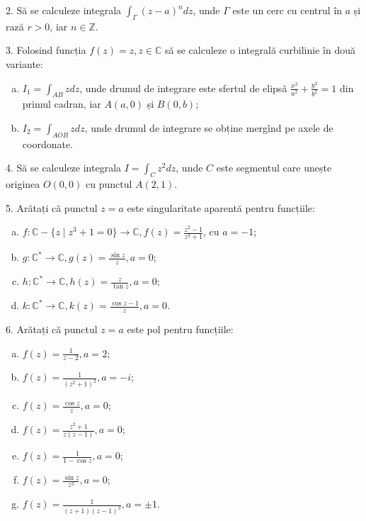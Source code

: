 \documentclass[12pt,a4paper]{article}
\newcommand\ds{\displaystyle}
\newcommand\ZZ{\mathbb{Z}}
\newcommand\CC{\mathbb{C}}
\theoremstyle{dotless}
\theoremstyle{dotlessdr}
\begin{document}
\vspace{1cm}

2. Să se calculeze integrala $ \ds\int_\Gamma (z - a)^n dz $, unde $ \Gamma $ este
un cerc cu centrul în $ a $ și rază $ r > 0 $, iar $ n \in \ZZ $.

\vspace{1cm}

3. Folosind funcția $ f(z) = z, z \in \CC $ să se calculeze o integrală curbilinie
în două variante:
\begin{enumerate}[(a)]
\item $ I_1 = \ds\int_{AB} zdz $, unde drumul de integrare este sfertul de
  elipsă $ \frac{x^2}{a^2} + \frac{y^2}{b^2} = 1 $ din primul cadran,
  iar $ A(a, 0) $ și $ B(0, b) $;
\item $ I_2 = \ds\int_{AOB} zdz $, unde drumul de integrare se obține mergînd
  pe axele de coordonate.
\end{enumerate}

\vspace{1cm}

4. Să se calculeze integrala $ I = \ds\int_C z^2 dz $, unde $ C $ este segmentul
care unește originea $ O(0, 0) $ cu punctul $ A(2, 1) $.

\vspace{1cm}

5. Arătați că punctul $ z = a $ este singularitate aparentă pentru funcțiile:
\begin{enumerate}[(a)]
\item $ f : \CC - \{ z \mid z^3 + 1 = 0 \} \to \CC, f(z) = \frac{z^2 - 1}{z^3 + 1} $,
  cu $ a = -1 $;
\item $ g : \CC^\ast \to \CC, g(z) = \frac{\sin z}{z}, a = 0 $;
\item $ h : \CC^\ast \to \CC, h(z) = \frac{z}{\tan z}, a = 0 $;
\item $ k : \CC^\ast \to \CC, k(z) = \frac{\cos z - 1}{z}, a = 0 $.
\end{enumerate}

\vspace{1cm}

6. Arătați că punctul $ z = a $ este pol pentru funcțiile:
\begin{enumerate}[(a)]
\item $ f(z) = \frac{1}{z - 2}, a = 2 $;
\item $ f(z) = \frac{1}{(z^2 + 1)^2}, a = - i $;
\item $ f(z) = \frac{\cos z}{z}, a = 0 $;
\item $ f(z) = \frac{z^2 + 1}{z(z - 1)}, a = 0$;
\item $ f(z) = \frac{1}{1 - \cos z}, a = 0 $;
\item $ f(z) = \frac{\sin z}{z^3}, a = 0 $;
\item $ f(z) = \frac{1}{(z + 1)(z - 1)^3}, a = \pm 1 $.
\end{enumerate}
\end{document}
